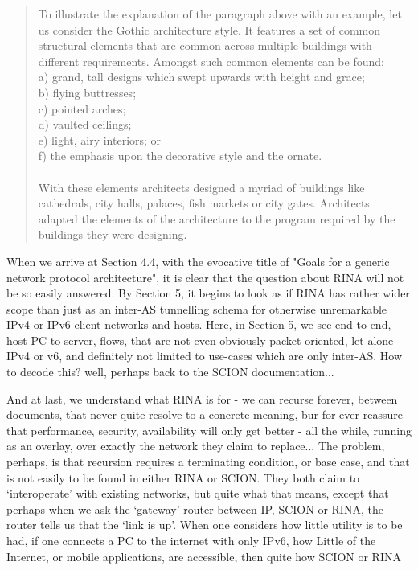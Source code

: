 \begin{quote}
	To illustrate the explanation of the paragraph above with an example, let us consider the Gothic architecture style. It
	features a set of common structural elements that are common across multiple buildings with different requirements.
	Amongst such common elements can be found:\\
	a) grand, tall designs which swept upwards with height and grace;\\
	b) flying buttresses;\\
	c) pointed arches;\\
	d) vaulted ceilings;\\
	e) light, airy interiors; or\\
	f) the emphasis upon the decorative style and the ornate.\\ \\
	With these elements architects designed a myriad of buildings like cathedrals, city halls, palaces, fish markets or city
	gates. Architects adapted the elements of the architecture to the program required by the buildings they were designing.
\end{quote}

When we arrive at Section 4.4, with the evocative title of "Goals for a generic network protocol architecture", it is clear that the question about RINA will not be so easily answered.
By Section 5, it begins to look as if RINA has rather wider scope than just as an inter-AS tunnelling schema for otherwise unremarkable IPv4 or IPv6 client networks and hosts.
Here, in Section 5, we see end-to-end, host PC to server, flows, that are not even obviously packet oriented, let alone IPv4 or v6, and definitely not limited to use-cases which are only inter-AS.
How to decode this?  well, perhaps back to the SCION documentation...

And at last, we understand what RINA is for - we can recurse forever, between documents, that never quite resolve to a concrete meaning, bur for ever reassure that performance, security, availability will only get better - all the while, running as an overlay, over exactly the network they claim to replace...  The problem, perhaps, is that recursion requires a terminating condition, or base case, and that is not easily to be found in either RINA or SCION.  They both claim to `interoperate' with existing networks, but quite what that means, except that perhaps when we ask the `gateway' router between IP, SCION or RINA, the router tells us that the `link is up'.  When one considers how little utility is to be had, if one connects a PC to the internet with only IPv6, how Little of the Internet, or mobile applications, are accessible, then quite how SCION or RINA

